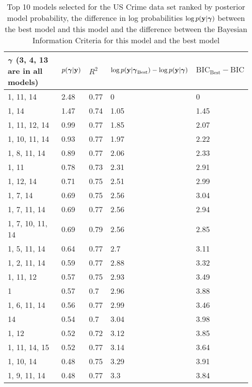 \documentclass{amsart}
\begin{document}
\begin{table}
\label{tab:numerical_results_uscrime}
\caption{Top 10 models selected for the US Crime data set ranked by posterior model probability, the
					difference in log probabilities $\log p({\bf y}|{\boldsymbol \gamma})$ between the best model and this model and the difference between the Bayesian Information Criteria for this model and the best model}
\begin{tabular}{|l|llll|}
\hline
${\boldsymbol \gamma}$ (3, 4, 13 are in all models)& $p({\boldsymbol \gamma}|{\bf y})$ & $R^2$ & $\log p({\bf y} | {\boldsymbol \gamma}_\text{Best}) - \log p({\bf y} | {\boldsymbol \gamma})$ & $\text{BIC}_\text{Best} - \text{BIC}$ \\
\hline
1, 11, 14&  2.48&  0.77&  0&  0\\
1, 14&  1.47&  0.74&  1.05&  1.45\\
1, 11, 12, 14&  0.99&  0.77&  1.85&  2.07\\
1, 10, 11, 14&  0.93&  0.77&  1.97&  2.22\\
1, 8, 11, 14&  0.89&  0.77&  2.06&  2.33\\
1, 11&  0.78&  0.73&  2.31&  2.91\\
1, 12, 14&  0.71&  0.75&  2.51&  2.99\\
1, 7, 14&  0.69&  0.75&  2.56&  3.04\\
1, 7, 11, 14&  0.69&  0.77&  2.56&  2.94\\
1, 7, 10, 11, 14&  0.69&  0.79&  2.56&  2.85\\
1, 5, 11, 14&  0.64&  0.77&  2.7&  3.11\\
1, 2, 11, 14&  0.59&  0.77&  2.88&  3.32\\
1, 11, 12&  0.57&  0.75&  2.93&  3.49\\
1&  0.57&  0.7&  2.96&  3.88\\
1, 6, 11, 14&  0.56&  0.77&  2.99&  3.46\\
14&  0.54&  0.7&  3.04&  3.98\\
1, 12&  0.52&  0.72&  3.12&  3.85\\
1, 11, 14, 15&  0.52&  0.77&  3.14&  3.64\\
1, 10, 14&  0.48&  0.75&  3.29&  3.91\\
1, 9, 11, 14&  0.48&  0.77&  3.3&  3.84\\
\hline
\end{tabular}
\end{table}
\end{document}
